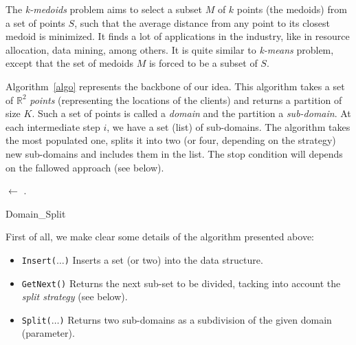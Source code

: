 The \textit{k-medoids} problem aims to select a subset $M$ of $k$ points (the medoids) from a set of points $S$, such that the average distance from any point to its closest medoid is minimized. It finds a lot of applications in the industry, like in resource allocation, data mining, among others. It is quite similar to \textit{k-means} problem, except that the set of medoids $M$ is forced to be a subset of $S$.

Algorithm~\ref{algo} represents the backbone of our idea. This algorithm takes a set of $\mathbb{R}^2$ {\it points} (representing the locations of the clients) and returns a partition of size $K$. Such a set of points is called a {\it domain} and the partition a {\it sub-domain}. At each intermediate step $i$, we have a set (list) of sub-domains. The algorithm takes the most populated one, splits it into two (or four, depending on the strategy) new sub-domains and includes them in the list. The stop condition will depends on the fallowed approach (see below).

\incmargin{1.4em}
\linesnumbered
\begin{algorithm}[H]
\dontprintsemicolon
\SetLine
{}

\BlankLine

\A $\leftarrow$ \Uni\;
\Q .\Insert{\A}\;
\caption{Domain\_Split}
\label{algo}
\end{algorithm}

First of all, we make clear some details of the algorithm presented above:

\begin{itemize}
\item \texttt{Insert($\dots$)} Inserts a set (or two) into the data structure. %
\item \texttt{GetNext()} Returns the next sub-set to be divided, tacking into account the {\it split strategy} (see below).
\item \texttt{Split($\dots$)} Returns two sub-domains as a subdivision of the given domain (parameter).
\end{itemize}


